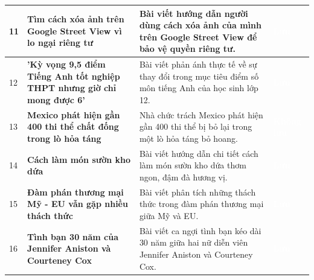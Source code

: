 \documentclass[12pt,a4paper]{article}
\begin{document}
\begin{longtable}{|p{}|L{0.45\textwidth}|L{0.42\textwidth}|p{0.06\textwidth}|}
11 & \textbf{Tìm cách xóa ảnh trên Google Street View vì lo ngại riêng tư}  & Bài viết hướng dẫn người dùng cách xóa ảnh của mình trên Google Street View để bảo vệ quyền riêng tư. & \textcolor{white}{\textbf{Lưu}} \\
\hline

12 & \textbf{'Kỳ vọng 9,5 điểm Tiếng Anh tốt nghiệp THPT nhưng giờ chỉ mong được 6'}  & Bài viết phản ánh thực tế về sự thay đổi trong mục tiêu điểm số môn tiếng Anh của học sinh lớp 12. & \textcolor{white}{\textbf{Lưu}} \\
\hline

13 & \textbf{Mexico phát hiện gần 400 thi thể chất đống trong lò hỏa táng}  & Nhà chức trách Mexico phát hiện gần 400 thi thể bị bỏ lại trong một lò hỏa táng bỏ hoang. & \textcolor{white}{\textbf{Không lưu}} \\
\hline

14 & \textbf{Cách làm món sườn kho dứa}  & Bài viết hướng dẫn chi tiết cách làm món sườn kho dứa thơm ngon, đậm đà hương vị. & \textcolor{white}{\textbf{Lưu}} \\
\hline

15 & \textbf{Đàm phán thương mại Mỹ - EU vẫn gặp nhiều thách thức}  & Bài viết phân tích những thách thức trong đàm phán thương mại giữa Mỹ và EU. & \textcolor{white}{\textbf{Lưu}} \\
\hline

16 & \textbf{Tình bạn 30 năm của Jennifer Aniston và Courteney Cox}  & Bài viết ca ngợi tình bạn kéo dài 30 năm giữa hai nữ diễn viên Jennifer Aniston và Courteney Cox. & \textcolor{white}{\textbf{Lưu}} \\
\hline


\end{longtable}
\end{document}
